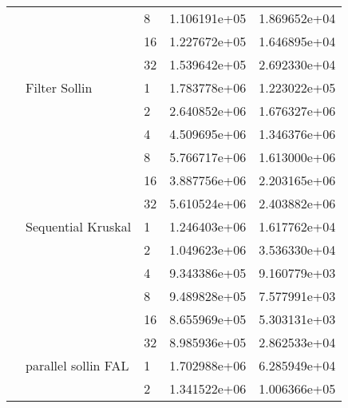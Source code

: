 \begin{tabular}{lllrr}
                                                       &                     & 8  &  1.106191e+05 &  1.869652e+04 \\
                                                       &                     & 16 &  1.227672e+05 &  1.646895e+04 \\
                                                       &                     & 32 &  1.539642e+05 &  2.692330e+04 \\
                                                       & Filter Sollin & 1  &  1.783778e+06 &  1.223022e+05 \\
                                                       &                     & 2  &  2.640852e+06 &  1.676327e+06 \\
                                                       &                     & 4  &  4.509695e+06 &  1.346376e+06 \\
                                                       &                     & 8  &  5.766717e+06 &  1.613000e+06 \\
                                                       &                     & 16 &  3.887756e+06 &  2.203165e+06 \\
                                                       &                     & 32 &  5.610524e+06 &  2.403882e+06 \\
                                                       & Sequential Kruskal & 1  &  1.246403e+06 &  1.617762e+04 \\
                                                       &                     & 2  &  1.049623e+06 &  3.536330e+04 \\
                                                       &                     & 4  &  9.343386e+05 &  9.160779e+03 \\
                                                       &                     & 8  &  9.489828e+05 &  7.577991e+03 \\
                                                       &                     & 16 &  8.655969e+05 &  5.303131e+03 \\
                                                       &                     & 32 &  8.985936e+05 &  2.862533e+04 \\
                                                       & parallel sollin FAL & 1  &  1.702988e+06 &  6.285949e+04 \\
                                                       &                     & 2  &  1.341522e+06 &  1.006366e+05 \\

\end{tabular}
